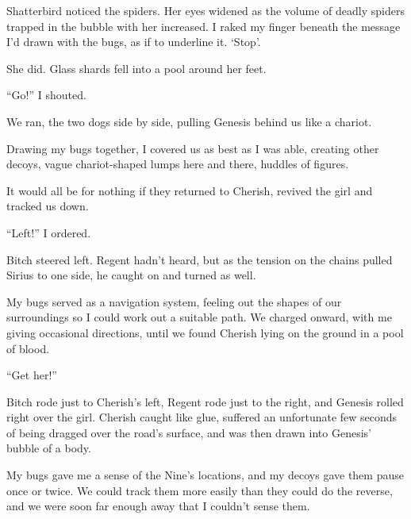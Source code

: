 Shatterbird noticed the spiders.  Her eyes widened as the volume of deadly spiders trapped in the bubble with her increased.  I raked my finger beneath the message I'd drawn with the bugs, as if to underline it.  `Stop'.



She did.  Glass shards fell into a pool around her feet.



``Go!''  I shouted.



We ran, the two dogs side by side, pulling Genesis behind us like a chariot.



Drawing my bugs together, I covered us as best as I was able, creating other decoys, vague chariot-shaped lumps here and there, huddles of figures.



It would all be for nothing if they returned to Cherish, revived the girl and tracked us down.



``Left!'' I ordered.



Bitch steered left.  Regent hadn't heard, but as the tension on the chains pulled Sirius to one side, he caught on and turned as well.



My bugs served as a navigation system, feeling out the shapes of our surroundings so I could work out a suitable path.  We charged onward, with me giving occasional directions, until we found Cherish lying on the ground in a pool of blood.



``Get her!''



Bitch rode just to Cherish's left, Regent rode just to the right, and Genesis rolled right over the girl.  Cherish caught like glue, suffered an unfortunate few seconds of being dragged over the road's surface, and was then drawn into Genesis' bubble of a body.



My bugs gave me a sense of the Nine's locations, and my decoys gave them pause once or twice.  We could track them more easily than they could do the reverse, and we were soon far enough away that I couldn't sense them.



\sectionbreak




